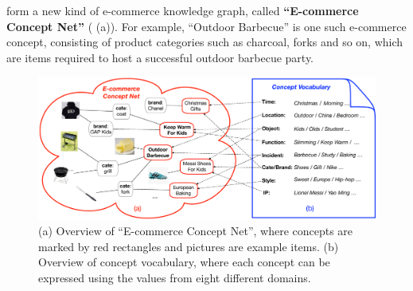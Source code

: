 form a new kind of e-commerce knowledge graph, called
\textbf{``E-commerce Concept Net''} ( (a)). 
For example, ``Outdoor Barbecue'' is one such e-commerce concept,  
consisting of product categories such as charcoal, forks and so on, 
which are items required to host a successful outdoor barbecue party.
\begin{figure}[th]
	\centering
	\includegraphics[width=2\columnwidth]{figures/concept_net}
	\caption{(a) Overview of ``E-commerce Concept Net'', where concepts are marked by red rectangles and pictures are  example items. (b) Overview of concept vocabulary, where each concept can be expressed using the values from eight different domains.}
	\label{fig:kg}
\end{figure}


